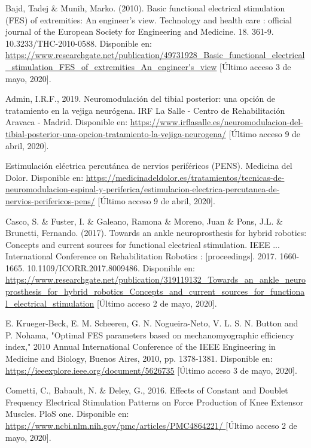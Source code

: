 \begin{thebibliography}{99}
 Bajd, Tadej \& Munih, Marko. (2010). Basic functional electrical stimulation (FES) of extremities: An engineer's view. Technology and health care : official journal of the European Society for Engineering and Medicine. 18. 361-9. 10.3233/THC-2010-0588.   Disponible en: \url{https://www.researchgate.net/publication/49731928_Basic_functional_electrical_stimulation_FES_of_extremities_An_engineer's_view} [Último acceso 3 de mayo, 2020].

 Admin, I.R.F., 2019. Neuromodulación del tibial posterior: una opción de tratamiento en la vejiga neurógena. IRF La Salle - Centro de Rehabilitación Aravaca - Madrid. Disponible en: \url{https://www.irflasalle.es/neuromodulacion-del-tibial-posterior-una-opcion-tratamiento-la-vejiga-neurogena/} [Último acceso 9 de abril, 2020].

 Estimulación eléctrica percutánea de nervios periféricos (PENS). Medicina del Dolor. Disponible en: \url{https://medicinadeldolor.es/tratamientos/tecnicas-de-neuromodulacion-espinal-y-periferica/estimulacion-electrica-percutanea-de-nervios-perifericos-pens/} [Último acceso 9 de abril, 2020].

 Casco, S. \& Fuster, I. \& Galeano, Ramona \& Moreno, Juan \& Pons, J.L. \& Brunetti, Fernando. (2017). Towards an ankle neuroprosthesis for hybrid robotics: Concepts and current sources for functional electrical stimulation. IEEE ... International Conference on Rehabilitation Robotics : [proceedings]. 2017. 1660-1665. 10.1109/ICORR.2017.8009486.  Disponible en: \url{https://www.researchgate.net/publication/319119132_Towards_an_ankle_neuroprosthesis_for_hybrid_robotics_Concepts_and_current_sources_for_functional_electrical_stimulation} [Último acceso 2 de mayo, 2020].

 E. Krueger-Beck, E. M. Scheeren, G. N. Nogueira-Neto, V. L. S. N. Button and P. Nohama, "Optimal FES parameters based on mechanomyographic efficiency index," 2010 Annual International Conference of the IEEE Engineering in Medicine and Biology, Buenos Aires, 2010, pp. 1378-1381.  Disponible en: \url{https://ieeexplore.ieee.org/document/5626735} [Último acceso 3 de mayo, 2020].

Cometti, C., Babault, N. \& Deley, G., 2016. Effects of Constant and Doublet Frequency Electrical Stimulation Patterns on Force Production of Knee Extensor Muscles. PloS one.  Disponible en: \url{https://www.ncbi.nlm.nih.gov/pmc/articles/PMC4864221/ } [Último acceso 2 de mayo, 2020].


\end{thebibliography}
